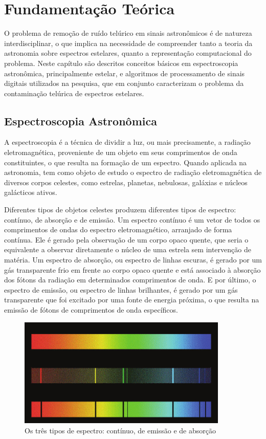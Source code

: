\chapter{Fundamentação Teórica}
\label{cap:fundamentacao-teorica}

O problema de remoção de ruído telúrico em sinais astronômicos é de natureza interdisciplinar, o que implica na necessidade de compreender tanto a teoria da astronomia sobre espectros estelares, quanto a representação computacional do problema.
Neste capítulo são descritos conceitos básicos em espectroscopia astronômica, principalmente estelar, e algoritmos de processamento de sinais digitais utilizados na pesquisa, que em conjunto caracterizam o problema da contaminação telúrica de espectros estelares.

\section{Espectroscopia Astronômica} \label{astronomic-spectroscopy}

A espectroscopia é a técnica de dividir a luz, ou mais precisamente, a radiação eletromagnética, proveniente de um objeto em seus comprimentos de onda constituintes, o que resulta na formação de um espectro. Quando aplicada na astronomia, tem como objeto de estudo o espectro de radiação eletromagnética de diversos corpos celestes, como estrelas, planetas, nebulosas, galáxias e núcleos galácticos ativos.

Diferentes tipos de objetos celestes produzem diferentes tipos de espectro:  contínuo, de absorção e de emissão. Um espectro contínuo é um vetor de todos os comprimentos de ondas do espectro eletromagnético, arranjado de forma contínua. Ele é gerado pela observação de um corpo opaco quente, que seria o equivalente a observar diretamente o núcleo de uma estrela sem intervenção de matéria. Um espectro de absorção, ou espectro de linhas escuras, é gerado por um gás transparente frio em frente ao corpo opaco quente e está associado à absorção dos fótons da radiação em determinados comprimentos de onda. E por último, o espectro de emissão, ou espectro de linhas brilhantes, é gerado por um gás transparente que foi excitado por uma fonte de energia próxima, o que resulta na emissão de fótons de comprimentos de onda específicos. 

\begin{figure}[htb]
\centering
\includegraphics[width=10cm]{figuras/Continuous-spectrum-and-two-types-of-line-spectra.png}
\caption{Os três tipos de espectro: contínuo, de emissão e de absorção \citep{mcgrawhill}}
\label{fig:spectrum-types}
\end{figure}

